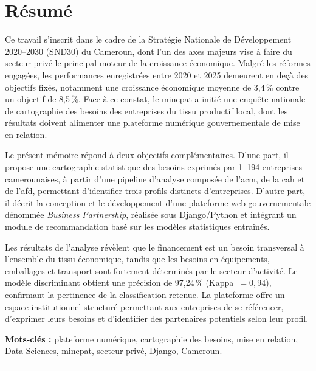 \documentclass[12pt, a4paper, oneside]{report}
\begin{document}
\chapter*{Résumé}
\thispagestyle{plain}

\medskip

Ce travail s'inscrit dans le cadre de la Stratégie Nationale de Développement 2020--2030 (SND30) du Cameroun, dont l'un des axes majeurs vise à faire du secteur privé le principal moteur de la croissance économique. Malgré les réformes engagées, les performances enregistrées entre 2020 et 2025 demeurent en deçà des objectifs fixés, notamment une croissance économique moyenne de 3,4\,\% contre un objectif de 8,5\,\%. Face à ce constat, le \gls{minepat} a initié une enquête nationale de cartographie des besoins des entreprises du tissu productif local, dont les résultats doivent alimenter une plateforme numérique gouvernementale de mise en relation.

Le présent mémoire répond à deux objectifs complémentaires. D'une part, il propose une cartographie statistique des besoins exprimés par 1~194 entreprises camerounaises, à partir d'une pipeline d'analyse composée de l'\gls{acm}, de la \gls{cah} et de l'\gls{afd}, permettant d'identifier trois profils distincts d'entreprises. D'autre part, il décrit la conception et le développement d'une plateforme web gouvernementale dénommée \textit{Business Partnership}, réalisée sous Django/Python et intégrant un module de recommandation basé sur les modèles statistiques entraînés.

Les résultats de l'analyse révèlent que le financement est un besoin transversal à l'ensemble du tissu économique, tandis que les besoins en équipements, emballages et transport sont fortement déterminés par le secteur d'activité. Le modèle discriminant obtient une précision de 97,24\,\% (Kappa~$= 0{,}94$), confirmant la pertinence de la classification retenue. La plateforme offre un espace institutionnel structuré permettant aux entreprises de se référencer, d'exprimer leurs besoins et d'identifier des partenaires potentiels selon leur profil.

\medskip
\textbf{Mots-clés :} plateforme numérique, cartographie des besoins, mise en relation, Data Sciences, \gls{minepat}, secteur privé, Django, Cameroun.

\vspace{1cm}
\begin{center}
  \rule{0.5\linewidth}{0.4pt}
\end{center}
\end{document}
